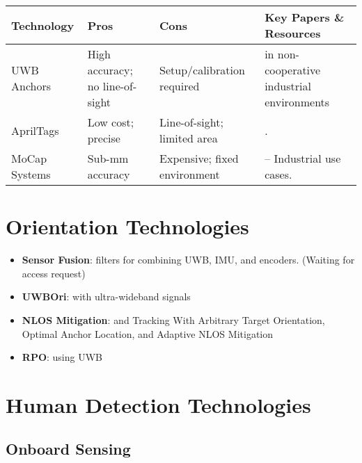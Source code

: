 \begin{table}[H]
    \centering
    \begin{tabular}{|>{\raggedright\arraybackslash}p{3cm}|>{\raggedright\arraybackslash}p{3cm}|>{\raggedright\arraybackslash}p{3cm}|>{\raggedright\arraybackslash}p{5cm}|}
        \hline
        \textbf{Technology} & \textbf{Pros} & \textbf{Cons} & \textbf{Key Papers \& Resources} \\ \hline
        UWB Anchors & High accuracy; no line-of-sight & Setup/calibration required & \cite{chen2018uwb} in non-cooperative industrial environments  \\ \hline
        
        AprilTags & Low cost; precise & Line-of-sight; limited area & \cite{olson2011apriltag}. \\ \hline
        
        MoCap Systems & Sub-mm accuracy & Expensive; fixed environment & \cite{optitrack2024robotics} – Industrial use cases. \\ \hline
    \end{tabular}
\end{table}


\section*{Orientation Technologies}
\begin{itemize}
    \item \textbf{Sensor Fusion}: \cite{huang2018sensor} filters for combining UWB, IMU, and encoders. (Waiting for access request)

    \item \textbf{UWBOri}: \cite{uwbori2024} with ultra-wideband signals 

    \item \textbf{NLOS Mitigation}: \cite{luo2020uwb} and Tracking With Arbitrary Target Orientation, Optimal Anchor Location, and Adaptive NLOS Mitigation

    \item \textbf{RPO}: \cite{rpo2019uwb} using UWB
\end{itemize}

\section*{Human Detection Technologies}
\subsection*{Onboard Sensing}

